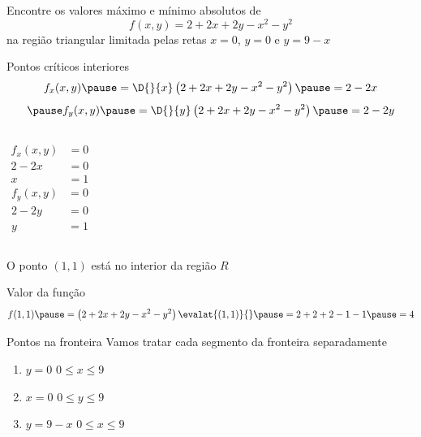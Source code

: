 \begin{question}
  Encontre os valores máximo e mínimo absolutos de
  \[
    f(x, y) = 2 + 2x + 2y - x^2 - y^2
  \]
  na região triangular limitada pelas retas
  \(x=0\), \(y=0\) e \(y = 9-x\)
\end{question}

\begin{resolution}{Pontos críticos interiores}
  \[
    f_x(x, y)
    \pause
    = \D{}{x}\left(2 + 2x + 2y - x^2 - y^2\right)
    \pause
    = 2-2x
  \]
  \[
    \pause
    f_y(x, y)
    \pause
    = \D{}{y}\left(2 + 2x + 2y - x^2 - y^2\right)
    \pause
    = 2-2y
  \]
  \vspace{-0.5\baselineskip}
  \begin{columns}
    \pause
    \begin{align*}
      f_x(x, y) & = 0 \\
      2-2x      & = 0 \\
      x         & = 1
    \end{align*}
    \pause
    \begin{align*}
      f_y(x, y) & = 0 \\
      2-2y      & = 0 \\
      y         & = 1
    \end{align*}
  \end{columns}

  \pause
  \vspace{0.5\baselineskip}
  O ponto $(1, 1)$ está no interior da região $R$
\end{resolution}

\begin{resolution}{Valor da função}
 \[
  f(1, 1)
    \pause
    = \left(2 + 2x + 2y - x^2 - y^2\right)\evalat{(1, 1)}{}
    \pause
    = 2 + 2 + 2 - 1 - 1
    \pause
    = 4
  \]
\end{resolution}

\begin{resolution}{Pontos na fronteira}
  Vamos tratar cada segmento da fronteira separadamente
  \begin{enumerate}[<+->]
    \item \(y=0\)   \tabto{24mm} \(0\leq x\leq 9\)
    \item \(x=0\)   \tabto{24mm} \(0\leq y\leq 9\)
    \item \(y=9-x\) \tabto{24mm} \(0\leq x\leq 9\)
  \end{enumerate}
\end{resolution}

